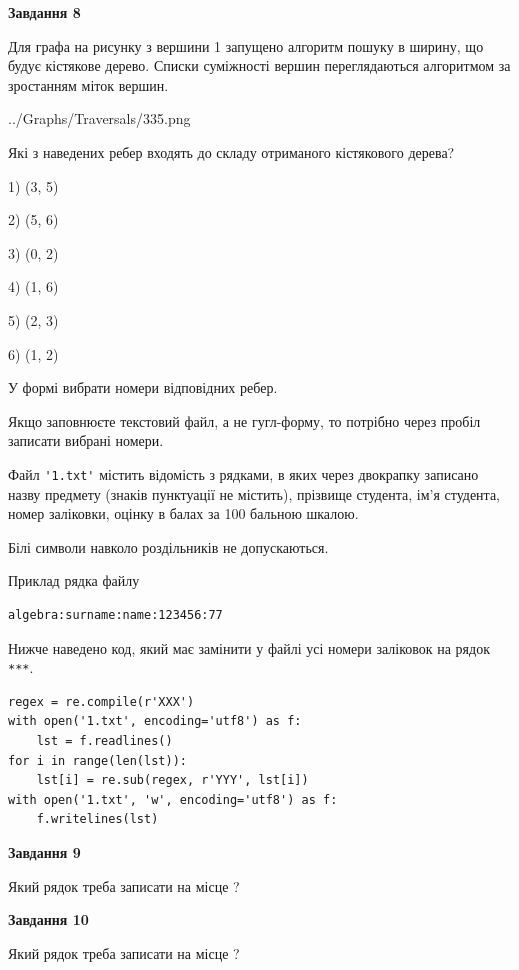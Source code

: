 \documentclass[12pt, ukrainian]{article}
\def\code#1{\Verb!#1!}
\begin{document}
{\begin {large}
{\begin {center}\textbf{Завдання 8}\end {center}}\par
Для графа на рисунку з вершини 1 запущено алгоритм пошуку в ширину, що будує кістякове дерево. Списки суміжності вершин переглядаються алгоритмом за зростанням міток вершин.\par
\begin{center}
	{../Graphs/Traversals/335.png}
\end{center}
\par Які з наведених ребер входять до складу отриманого кістякового дерева?\par
1) (3, 5)\par
2) (5, 6)\par
3) (0, 2)\par
4) (1, 6)\par
5) (2, 3)\par
6) (1, 2)\par
{\vskip 15pt} У формі вибрати номери відповідних ребер.


Якщо заповнюєте текстовий файл, а не гугл-форму, то потрібно через пробіл записа\-ти вибрані номери.\par
\newpage


Файл \code{'1.txt'} містить відомість з рядками, в яких через двокрапку записа\-но назву предмету (знаків пунктуації не містить), прізвище студента, ім'я студента, номер залі\-ков\-ки, оцінку в балах за 100 бальною шкалою.

Білі символи навколо роздільників не допускаються.

Приклад рядка файлу



\begin{verbatim}
algebra:surname:name:123456:77
\end{verbatim}


Нижче наведено код, який має замінити у файлі усі номери заліковок на рядок \code{***}.



\begin{verbatim}
regex = re.compile(r'XXX')
with open('1.txt', encoding='utf8') as f:
    lst = f.readlines()
for i in range(len(lst)):
    lst[i] = re.sub(regex, r'YYY', lst[i])
with open('1.txt', 'w', encoding='utf8') as f:
    f.writelines(lst)
\end{verbatim}




{\begin {center}\textbf{Завдання 9}\end {center}}\par
Який рядок треба записати на місце  ?\par
\vspace{5mm}


{\begin {center}\textbf{Завдання 10}\end {center}}\par
Який рядок треба записати на місце  ?\par


\newpage


\end {large}}
\end{document}

